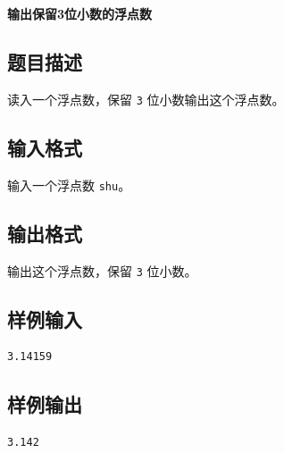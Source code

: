 \documentclass{article}
\newcommand{\problemname}[1]{\begin{center}\Large\bfseries #1\end{center}}
\begin{document}
\problemname{输出保留3位小数的浮点数}

\subsection*{题目描述}
读入一个浮点数，保留 \texttt{3} 位小数输出这个浮点数。

\subsection*{输入格式}
输入一个浮点数 \texttt{shu}。

\subsection*{输出格式}
输出这个浮点数，保留 \texttt{3} 位小数。

\subsection*{样例输入}
\begin{verbatim}
3.14159
\end{verbatim}

\subsection*{样例输出}
\begin{verbatim}
3.142
\end{verbatim}
\end{document}
